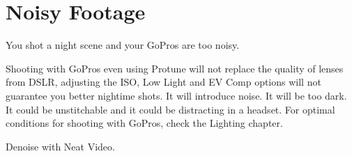 \chapter{Noisy Footage}
\pagecolor{white}
\label{chap:55}
\begin{fullwidth}

\problem

{\large You shot a night scene and your GoPros are too noisy. \par}

Shooting with GoPros even using Protune will not replace the quality of lenses from DSLR, adjusting the ISO, Low Light and EV Comp options will not guarantee you better nightime shots. It will introduce noise. It will be too dark. It could be unstitchable and it could be distracting in a headset. For optimal conditions for shooting with GoPros, check the Lighting chapter.

\solutions

{\large Denoise with Neat Video. \par}



\clearpage
\end{fullwidth}